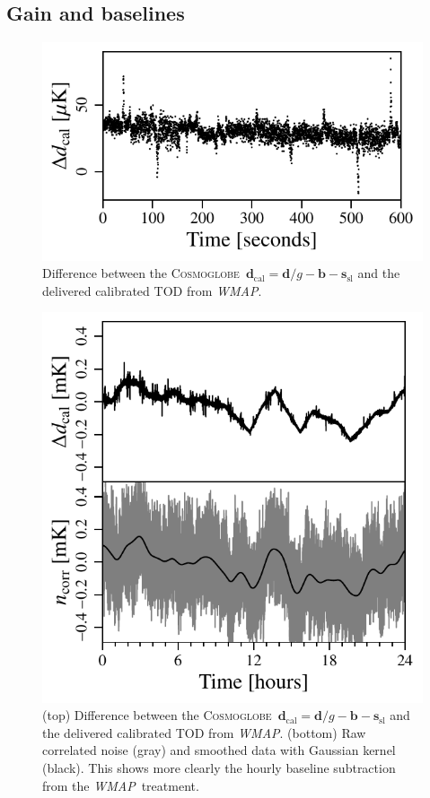 \documentclass[twocolumn]{../../common/aa}
\def\WMAP{\emph{WMAP}}
\newcommand{\cosmoglobe}{\textsc{Cosmoglobe}}
\begin{document}
\subsection{Gain and baselines}
\label{sec:gain}

\begin{figure}
	\includegraphics[width=\columnwidth]{figures/K113_TOD_diff_10min.pdf}
	\caption{Difference between the \cosmoglobe\ $\boldsymbol d_\mathrm{cal}=\boldsymbol d/g-\boldsymbol b - \boldsymbol s_\mathrm{sl}$ and the delivered calibrated TOD from \WMAP.}
	\label{fig:cal_comp_10min}
\end{figure}

\begin{figure}
	\includegraphics[width=\columnwidth]{figures/K113_TOD_diff_10hr.pdf}
	\caption{(top) Difference between the \cosmoglobe\ $\boldsymbol d_\mathrm{cal}=\boldsymbol d/g-\boldsymbol b - \boldsymbol s_\mathrm{sl}$ and the delivered calibrated TOD from \WMAP. (bottom) Raw correlated noise (gray) and smoothed data with Gaussian kernel (black). This shows more clearly the hourly baseline subtraction from the \WMAP\ treatment.}
	\label{fig:cal_comp}
\end{figure}
\end{document}
